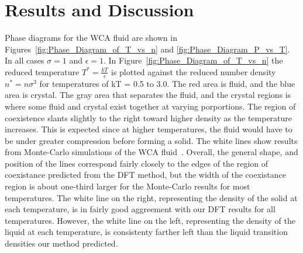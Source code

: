 \documentclass[double,12pt]{beavtex}
\begin{document}



\chapter{Results and Discussion}

Phase diagrams for the WCA fluid are shown in Figures~\ref{fig:Phase_Diagram_of_T_vs_n} 
and \ref{fig:Phase_Diagram_P_vs_T}. In all cases $\sigma=1$ and $\epsilon=1$. 
In Figure~\ref{fig:Phase_Diagram_of_T_vs_n} the reduced temperature $T^*=\frac{kT}{\epsilon}$ 
is plotted against the reduced number density $n^*=n\sigma^3$ for temperatures of kT = 0.5 to 3.0. 
The red area is fluid, and the blue area is crystal. The gray area that separates the fluid, 
and the crystal regions is where some fluid and crystal exist together at varying porportions. 
The region of coexistence slants slightly to the right toward higher density as the temperature 
increases. This is expected since at higher temperatures, the fluid would have to be under 
greater compression before forming a solid. The white lines show results from Monte-Carlo 
simulations of the WCA fluid~\cite{May}. Overall, the general shape, and position of the lines correspond
fairly closely to the edges of the region of coexistance predicted from the DFT method, 
but the width of the coexistance region is about one-third larger for the Monte-Carlo results 
for most temperatures. The white line on the right, representing the density of the solid at 
each temperature, is in fairly good aggreement with our DFT results for all temperatures. 
However, the white line on the left, representing the density of the liquid at each temperature, 
is consistenty farther left than the liquid transition densities our method predicted.
\end{document}
